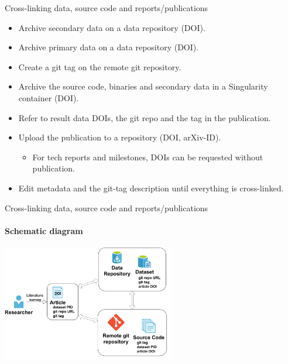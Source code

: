 \documentclass[
	ngerman,%
	aspectratio=169,%
	color={accentcolor=2d},
	logo=true,%
	colorframetitle=true,%
	]{tudabeamer}
\begin{document}

\begin{frame}{Cross-linking data, source code and reports/publications} 
	
	\vfill
	\begin{itemize}
		\item Archive secondary data on a data repository (DOI). 
		\item Archive primary data on a data repository (DOI). 
		\item Create a git tag on the remote git repository. 
		\item Archive the source code, binaries and secondary data in a Singularity container (DOI). 
		\item Refer to result data DOIs, the git repo and the tag in the publication.
		\item Upload the publication to a repository (DOI, arXiv-ID).
			\begin{itemize}
				\item For tech reports and milestones, DOIs can be requested without publication.
			\end{itemize}
		\item Edit metadata and the git-tag description until everything is cross-linked.
	\end{itemize}

\end{frame}

\begin{frame}{Cross-linking data, source code and reports/publications} 
	\framesubtitle{Schematic diagram}
	
	\begin{center}
		\includegraphics[width=0.57\textwidth]{figures/cross-linking.pdf}
	\end{center}

\end{frame}
\end{document}
